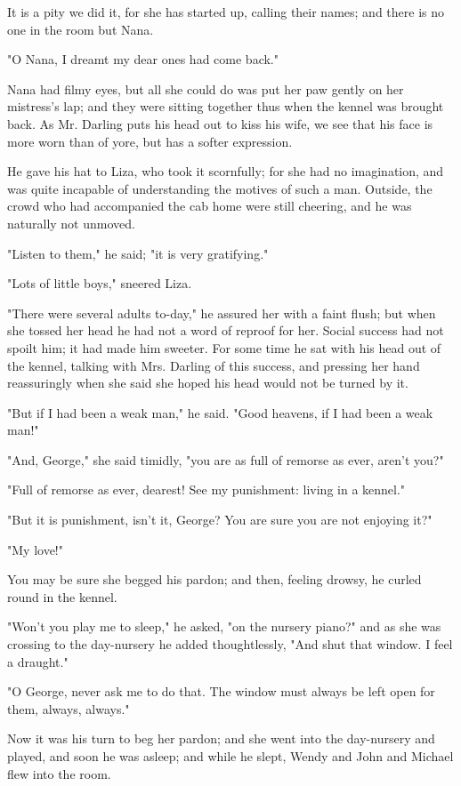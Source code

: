 It is a pity we did it, for she has started up, calling their names; and
there is no one in the room but Nana.


"O Nana, I dreamt my dear ones had come back."


Nana had filmy eyes, but all she could do was put her paw gently on her
mistress's lap; and they were sitting together thus when the kennel was
brought back. As Mr. Darling puts his head out to kiss his wife, we see
that his face is more worn than of yore, but has a softer expression.


He gave his hat to Liza, who took it scornfully; for she had no
imagination, and was quite incapable of understanding the motives of such
a man. Outside, the crowd who had accompanied the cab home were still
cheering, and he was naturally not unmoved.


"Listen to them," he said; "it is very gratifying."


"Lots of little boys," sneered Liza.


"There were several adults to-day," he assured her with a faint flush; but
when she tossed her head he had not a word of reproof for her. Social
success had not spoilt him; it had made him sweeter. For some time he sat
with his head out of the kennel, talking with Mrs. Darling of this
success, and pressing her hand reassuringly when she said she hoped his
head would not be turned by it.


"But if I had been a weak man," he said. "Good heavens, if I had been a
weak man!"


"And, George," she said timidly, "you are as full of remorse as ever,
aren't you?"


"Full of remorse as ever, dearest! See my punishment: living in a kennel."


"But it is punishment, isn't it, George? You are sure you are not enjoying
it?"


"My love!"


You may be sure she begged his pardon; and then, feeling drowsy, he curled
round in the kennel.


"Won't you play me to sleep," he asked, "on the nursery piano?" and as she
was crossing to the day-nursery he added thoughtlessly, "And shut that
window. I feel a draught."


"O George, never ask me to do that. The window must always be left open
for them, always, always."


Now it was his turn to beg her pardon; and she went into the day-nursery
and played, and soon he was asleep; and while he slept, Wendy and John and
Michael flew into the room.


